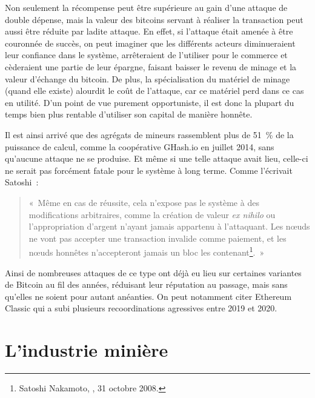 Non seulement la récompense peut être supérieure au gain d'une attaque de double dépense, mais la valeur des bitcoins servant à réaliser la transaction peut aussi être réduite par ladite attaque. En effet, si l'attaque était amenée à être couronnée de succès, on peut imaginer que les différents acteurs diminueraient leur confiance dans le système, arrêteraient de l'utiliser pour le commerce et cèderaient une partie de leur épargne, faisant baisser le revenu de minage et la valeur d'échange du bitcoin. De plus, la spécialisation du matériel de minage (quand elle existe) alourdit le coût de l'attaque, car ce matériel perd dans ce cas en utilité. D'un point de vue purement opportuniste, il est donc la plupart du temps bien plus rentable d'utiliser son capital de manière honnête.

Il est ainsi arrivé que des agrégats de mineurs rassemblent plus de 51~\% de la puissance de calcul, comme la coopérative GHash.io en juillet 2014, sans qu'aucune attaque ne se produise. Et même si une telle attaque avait lieu, celle-ci ne serait pas forcément fatale pour le système à long terme. Comme l'écrivait Satoshi~:

\begin{quote}
«~Même en cas de réussite, cela n'expose pas le système à des modifications arbitraires, comme la création de valeur \emph{ex nihilo} ou l'appropriation d'argent n'ayant jamais appartenu à l'attaquant. Les nœuds ne vont pas accepter une transaction invalide comme paiement, et les nœuds honnêtes n'accepteront jamais un bloc les contenant\footnote{Satoshi Nakamoto, , 31 octobre 2008.}.~»
\end{quote}

Ainsi de nombreuses attaques de ce type ont déjà eu lieu sur certaines variantes de Bitcoin au fil des années, réduisant leur réputation au passage, mais sans qu'elles ne soient pour autant anéanties. On peut notamment citer Ethereum Classic qui a subi plusieurs recoordinations agressives entre 2019 et 2020.

\vspace{-1em}
\section*{L'industrie minière}

